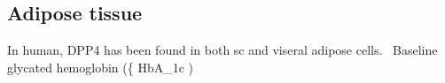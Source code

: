 \subsection{Adipose tissue}
In human, DPP4 has been found in both sc and viseral adipose cells.~\cite{Lamers2011} Baseline glycated hemoglobin (\{ HbA_{1c} ) 